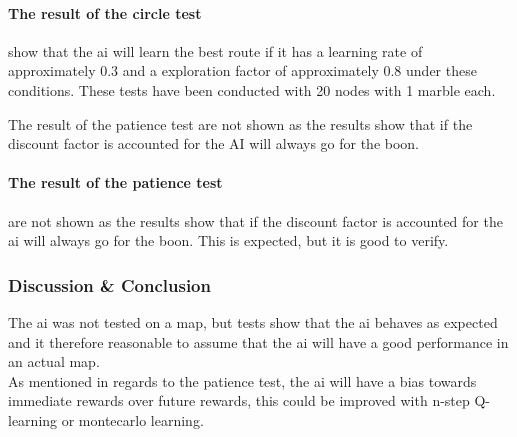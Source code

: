 \documentclass[../../../Main.tex]{subfiles}
\begin{document}
\paragraph{The result of the circle test}%
\label{par:the_result_of_the_circle_test}

show that the  ai will learn the best route if it has a learning rate of approximately 0.3 and
a exploration factor of approximately 0.8 under these conditions. These tests have been conducted
with 20 nodes with 1 marble each.

The result of the patience test are not shown as the results show that if the discount factor is
accounted for the AI will always go for the boon.

\paragraph{The result of the patience test}%
\label{par:the_result_of_the_patience_test}
are not shown as the results show that if the discount factor is
accounted for the ai will always go for the boon. This is expected, but it is good to verify.

\subsubsection{Discussion \& Conclusion}%
\label{ssub:conclussion}

The ai was not tested on a map, but tests show that the ai behaves as expected and it therefore
reasonable to assume that the ai will have a good performance in an actual map.\\
As mentioned in regards to the patience test, the ai will have a bias towards immediate rewards over
future rewards, this could be improved with n-step Q-learning or montecarlo learning.
	
\end{document}

